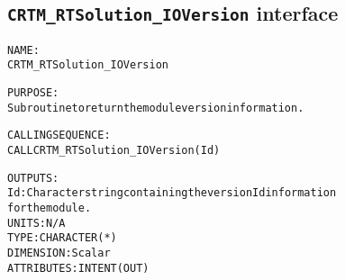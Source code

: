 \subsection{\texttt{CRTM\_RTSolution\_IOVersion} interface}
  \label{sec:CRTM_RTSolution_IOVersion_interface}
  \begin{alltt}
 
  NAME:
        CRTM_RTSolution_IOVersion
 
  PURPOSE:
        Subroutine to return the module version information.
 
  CALLING SEQUENCE:
        CALL CRTM_RTSolution_IOVersion( Id )
 
  OUTPUTS:
        Id:            Character string containing the version Id information
                       for the module.
                       UNITS:      N/A
                       TYPE:       CHARACTER(*)
                       DIMENSION:  Scalar
                       ATTRIBUTES: INTENT(OUT)
 
  \end{alltt}

